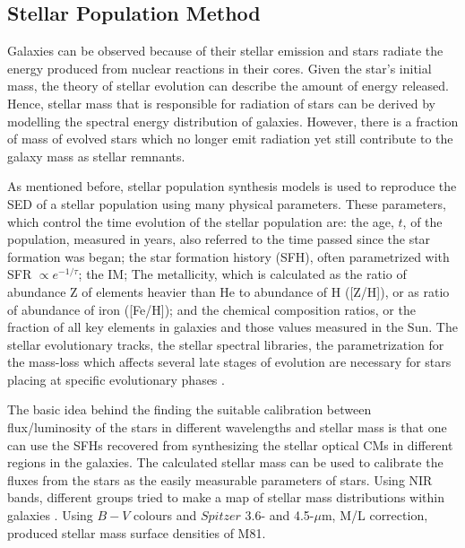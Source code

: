 \subsection{Stellar Population Method}
Galaxies can be observed because of their stellar emission and stars radiate the energy produced from nuclear reactions in their cores. Given the star's initial mass, the theory of stellar evolution can describe the amount of energy released. Hence, stellar mass that is responsible for radiation of stars can be derived by modelling the spectral energy distribution of galaxies. However, there is a fraction of mass of evolved stars which no longer emit radiation yet still contribute to the galaxy mass as stellar remnants. 

As mentioned before, stellar population synthesis models is used to reproduce the SED of a stellar population using many physical parameters. These parameters, which control the time evolution of the stellar population are:
the age, $t$, of the population, measured in years, also referred to the time passed since the star formation was began;
the star formation history (SFH), often parametrized with SFR $\propto e^{-1/\tau}$; the IM; The metallicity, which is calculated as the ratio of abundance Z of elements heavier than He to abundance of H ([Z/H]), or as ratio of abundance of iron ([Fe/H]); 
and the chemical composition ratios, or the fraction of all key elements in galaxies and those values measured in the Sun. The stellar evolutionary tracks, the stellar spectral libraries, the parametrization for the mass-loss which affects several late stages of evolution are necessary for stars placing at specific evolutionary phases \citep{Courteau13}.


The basic idea behind the finding the suitable calibration between flux/luminosity of the stars in different wavelengths and stellar mass is that one can use the SFHs recovered from synthesizing the stellar optical CMs in different regions in the galaxies. The calculated stellar mass can be used  to calibrate the fluxes from the stars as the easily measurable parameters of stars. Using NIR bands, different groups tried to make a map of stellar mass distributions within galaxies \citep[e.g.,][]{Elmgreen84}.  Using $B-V$ colours \citep{Bell01} and $Spitzer$ 3.6- and 4.5-$\mu$m, M/L correction, \cite{Kendall08} produced stellar mass surface densities of M81. 


